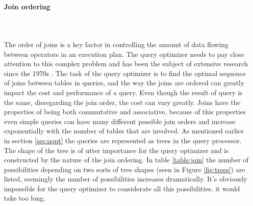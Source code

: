 \documentclass{cslthse-msc}
\begin{document}
\paragraph*{Join ordering}\mbox{}\\\\
The order of joins is a key factor in controlling the amount of data flowing between operators in an execution plan. The query optimizer needs to pay close attention to this complex problem and has been the subject of extensive research since the 1970s   \cite{join}. The task of the query optimizer is to find the optimal sequence of joins between tables in queries, and the way the joins are ordered can greatly impact the cost and performance of a query. Even though the result of query is the same, disregarding the join order, the cost can vary greatly. Joins have the properties of being both commutative and associative, because of this properties even simple queries can have many different possible join orders and increase exponentially with the number of tables that are involved. As mentioned earlier in section \ref{sec:qopt} the queries are represented as trees in the query processor. The shape of the tree is of utter importance for the query optimizer and is constructed by the nature of the join ordering. In table \ref{table:join} the number of possibilities depending on two sorts of tree shapes (seen in Figure \ref{fig:trees}) are listed, seemingly the number of possibilities increases dramatically. It's obviously impossible for the query optimizer to considerate all this possibilities, it would take too long.  
\end{document}
